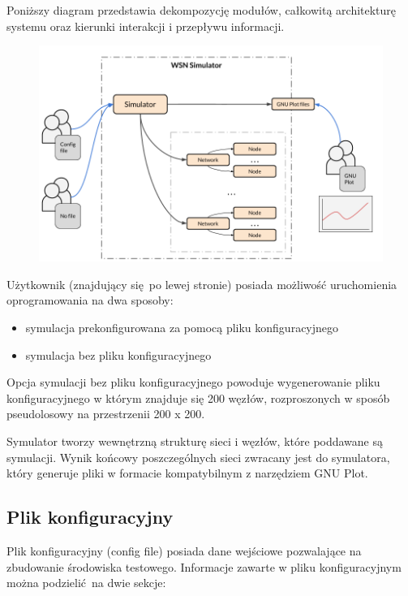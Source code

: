 \documentclass[a4paper,12pt,twoside,openany]{report}
\begin{document}
Poniższy diagram przedstawia dekompozycję modułów, całkowitą architekturę systemu oraz kierunki interakcji i przepływu informacji.

\begin{figure}[H]
 \centering
 \includegraphics[width=13cm]{images/architektura_systemu.png} 
\end{figure}

Użytkownik (znajdujący się po lewej stronie) posiada możliwość uruchomienia oprogramowania na dwa sposoby: 

\begin{itemize}
 \item symulacja prekonfigurowana za pomocą pliku konfiguracyjnego
 \item symulacja bez pliku konfiguracyjnego
\end{itemize}

Opcja symulacji bez pliku konfiguracyjnego powoduje wygenerowanie pliku konfiguracyjnego w którym znajduje się 200 węzłów, rozproszonych w sposób
pseudolosowy na przestrzenii 200 x 200.

Symulator tworzy wewnętrzną strukturę sieci i węzłów, które poddawane są symulacji. Wynik końcowy poszczególnych sieci zwracany jest do symulatora, który
generuje pliki w formacie kompatybilnym z narzędziem GNU Plot. 

\subsection{Plik konfiguracyjny}

Plik konfiguracyjny (config file) posiada dane wejściowe pozwalające na zbudowanie środowiska testowego. 
Informacje zawarte w pliku konfiguracyjnym można podzielić na dwie sekcje:
\end{document}
